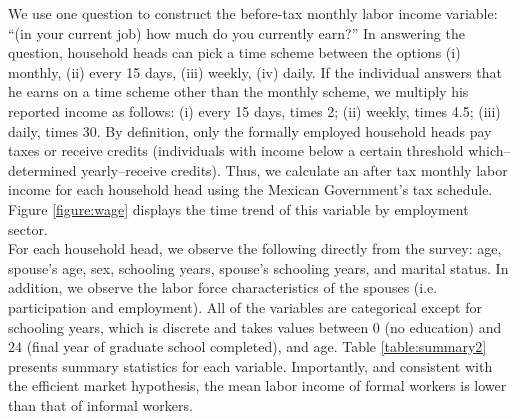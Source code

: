 \documentclass{svjour3}                     %
\begin{document}
\indent We use one question to construct the before-tax monthly labor income variable: ``(in your current job) how much do you currently earn?'' In answering the question, household heads can pick a time scheme between the options (i) monthly, (ii) every 15 days, (iii) weekly, (iv) daily. If the individual answers that he earns on a time scheme other than the monthly scheme, we multiply his reported income as follows: (i) every 15 days, times 2; (ii) weekly, times 4.5; (iii) daily, times 30. By definition, only the formally employed household heads pay taxes or receive credits (individuals with income below a certain threshold which--determined yearly--receive credits). Thus, we calculate an after tax monthly labor income for each household head using the Mexican Government's tax schedule. Figure \ref{figure:wage} displays the time trend of this variable by employment sector. \\
\indent For each household head, we observe the following directly from the survey: age, spouse's age, sex, schooling years, spouse's schooling years, and marital status. In addition, we observe the labor force characteristics of the spouses (i.e. participation and employment). All of the variables are categorical except for schooling years, which is discrete and takes values between 0 (no education) and $24$ (final year of graduate school completed), and age. Table \ref{table:summary2} presents summary statistics for each variable. Importantly, and consistent with the efficient market hypothesis, the mean labor income of formal workers is lower than that of informal workers.\\
\end{document}
